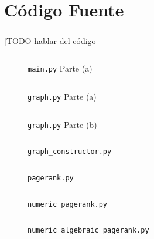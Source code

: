 \documentclass{subfiles}
\begin{document}
  \chapter{Código Fuente}

    \paragraph{}
    [TODO hablar del código]

    \begin{figure}
      \centering
      \inputminted[lastline=55,linenos]{python}{../main.py}
      \caption{\texttt{main.py} Parte (a)}
      \label{code:main}
    \end{figure}

    \begin{figure}
      \centering
      \inputminted[lastline=55,linenos]{python}{../src/graph/graph.py}
      \caption{\texttt{graph.py} Parte (a)}
      \label{code:graph_a}
    \end{figure}

    \begin{figure}
      \centering
      \inputminted[firstline=56,linenos]{python}{../src/graph/graph.py}
      \caption{\texttt{graph.py} Parte (b)}
      \label{code:graph_b}
    \end{figure}

    \begin{figure}
      \centering
      \inputminted[linenos]{python}{../src/graph/graph_constructor.py}
      \caption{\texttt{graph\_constructor.py}}
      \label{code:graph_constructor}
    \end{figure}


    \begin{figure}
      \centering
      \inputminted[linenos]{python}{../src/pagerank/pagerank.py}
      \caption{\texttt{pagerank.py}}
      \label{code:pagerank}
    \end{figure}

    \begin{figure}
      \centering
      \inputminted[linenos]{python}{../src/pagerank/numeric_pagerank.py}
      \caption{\texttt{numeric\_pagerank.py}}
      \label{code:numeric_pagerank}
    \end{figure}

    \begin{figure}
      \centering
      \inputminted[linenos]{python}{../src/pagerank/numeric_algebraic_pagerank.py}
      \caption{\texttt{numeric\_algebraic\_pagerank.py}}
      \label{code:numeric_algebraic_pagerank}
    \end{figure}
\end{document}
